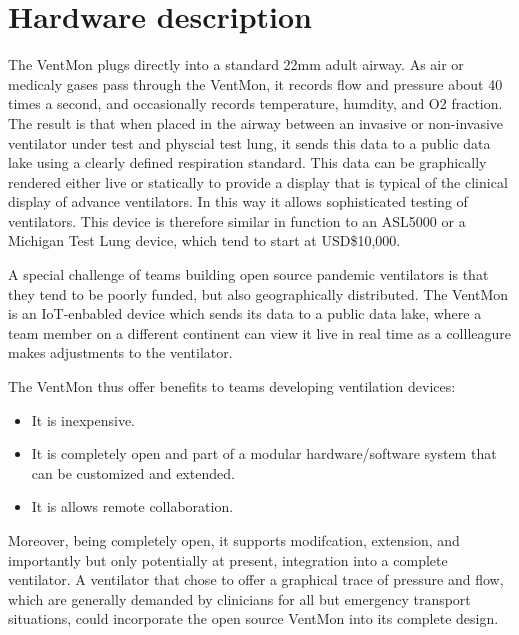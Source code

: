 \documentclass[11pt, letterpaper]{article}
\begin{document}
\section{Hardware description}


The VentMon plugs directly into a standard 22mm adult airway. As air or medicaly gases pass through the VentMon, it records
flow and pressure about 40 times a second, and occasionally records temperature, humdity, and O2 fraction.
The result is that when placed in the airway between an invasive or non-invasive ventilator
under test and physcial test lung, it sends
this data to a public data lake using a clearly defined respiration standard. This data can be graphically
rendered either live or statically to provide a display that is typical of the clinical display of advance ventilators.
In this way it allows sophisticated testing of ventilators. This device is therefore similar in function to
an ASL5000 or a Michigan Test Lung device, which tend to start at USD\$10,000.

A special challenge of teams building open source pandemic ventilators is that they tend to be poorly funded,
but also geographically distributed. The VentMon is an IoT-enbabled device which sends its data to a public data lake,
where a team member on a different continent can view it live in real time as a collleagure makes adjustments
to the ventilator.

The VentMon thus offer benefits to teams developing ventilation devices:
\begin{itemize}
\item It is inexpensive.
\item It is completely open and part of a modular hardware/software system that can be customized and extended.
\item It is allows remote collaboration.
\end{itemize}

Moreover, being completely open, it supports modifcation, extension, and importantly but only potentially at present,
integration into a complete ventilator. A ventilator that chose to offer a graphical trace of pressure and flow,
which are generally demanded by clinicians for all but emergency transport situations, could incorporate the
open source VentMon into its complete design.
\end{document}
